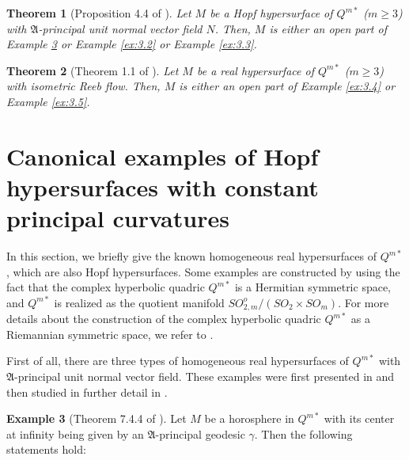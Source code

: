 \documentclass[reqno]{amsart}%
\newtheorem{theorem}{Theorem}[section]   %
\theoremstyle{definition}
\newtheorem{example}[theorem]{Example}
\numberwithin{equation}{section}
\begin{document}
\begin{theorem}[Proposition 4.4 of \cite{KSW}]\label{thm:2.7}
Let $M$ be a Hopf hypersurface of $Q^{m*}$ ($m\geq3$) with $\mathfrak{A}$-principal unit normal vector field $N$. Then,
$M$ is either an open part of Example \ref{ex:3.1} or Example \ref{ex:3.2} or Example \ref{ex:3.3}.
\end{theorem}



\begin{theorem}[Theorem 1.1 of \cite{Suh4}]\label{thm:2.2}
Let $M$ be a real hypersurface of $Q^{m*}$ ($m\geq3$) with isometric Reeb flow.
Then, $M$ is either an open part of Example \ref{ex:3.4} or
Example \ref{ex:3.5}.
\end{theorem}




\section{Canonical examples of Hopf hypersurfaces with constant principal curvatures}\label{sect:3}

In this section, we briefly give the known homogeneous real hypersurfaces of $Q^{m*}$,
which are also Hopf hypersurfaces. Some examples are constructed by
using the fact that the complex hyperbolic quadric $Q^{m*}$ is a Hermitian symmetric space,
and $Q^{m*}$ is realized as the quotient manifold $SO^o_{2,m}/(SO_2\times SO_m)$.
For more details about the construction of the complex hyperbolic quadric $Q^{m*}$ as a Riemannian
symmetric space, we refer to \cite{B-2023,BS-2022,K-S}.

First of all, there are three types of homogeneous real hypersurfaces of $Q^{m*}$ with $\mathfrak{A}$-principal unit normal vector field. These examples were first presented in \cite{BS-2015}
and then studied in further detail in \cite{BS-2022,K-S}.

\begin{example}[Theorem 7.4.4 of \cite{BS-2022}]\label{ex:3.1}
Let $M$ be a horosphere in $Q^{m*}$ with its center at infinity being given by an
$\mathfrak{A}$-principal geodesic $\gamma$. Then the following statements hold:
%
\end{example}
\end{document}
